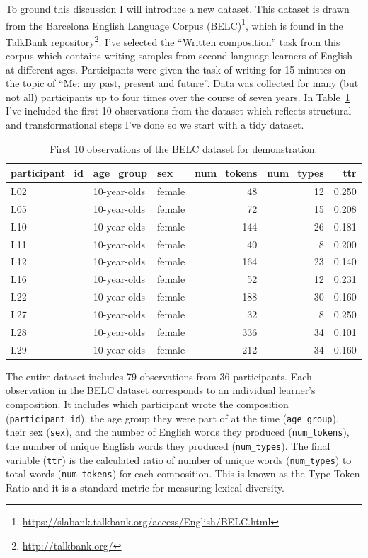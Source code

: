 \documentclass[
  letterpaper,
]{latex/krantz}
\DeclareRobustCommand{\href}[2]{#2\footnote{\url{#1}}}
\begin{document}
To ground this discussion I will introduce a new dataset. This dataset
is drawn from the
\href{https://slabank.talkbank.org/access/English/BELC.html}{Barcelona
English Language Corpus (BELC)}, which is found in the
\href{http://talkbank.org/}{TalkBank repository}. I've selected the
``Written composition'' task from this corpus which contains writing
samples from second language learners of English at different ages.
Participants were given the task of writing for 15 minutes on the topic
of ``Me: my past, present and future''. Data was collected for many (but
not all) participants up to four times over the course of seven years.
In Table~\ref{tbl-belc-overview} I've included the first 10 observations
from the dataset which reflects structural and transformational steps
I've done so we start with a tidy dataset.

\hypertarget{tbl-belc-overview}{}
\begin{table}
\caption{\label{tbl-belc-overview}First 10 observations of the BELC dataset for demonstration. }\tabularnewline

\centering
\begin{tabular}{l|l|l|r|r|r}
\hline
participant\_id & age\_group & sex & num\_tokens & num\_types & ttr\\
\hline
L02 & 10-year-olds & female & 48 & 12 & 0.250\\
\hline
L05 & 10-year-olds & female & 72 & 15 & 0.208\\
\hline
L10 & 10-year-olds & female & 144 & 26 & 0.181\\
\hline
L11 & 10-year-olds & female & 40 & 8 & 0.200\\
\hline
L12 & 10-year-olds & female & 164 & 23 & 0.140\\
\hline
L16 & 10-year-olds & female & 52 & 12 & 0.231\\
\hline
L22 & 10-year-olds & female & 188 & 30 & 0.160\\
\hline
L27 & 10-year-olds & female & 32 & 8 & 0.250\\
\hline
L28 & 10-year-olds & female & 336 & 34 & 0.101\\
\hline
L29 & 10-year-olds & female & 212 & 34 & 0.160\\
\hline
\end{tabular}
\end{table}

The entire dataset includes 79 observations from 36 participants. Each
observation in the BELC dataset corresponds to an individual learner's
composition. It includes which participant wrote the composition
(\texttt{participant\_id}), the age group they were part of at the time
(\texttt{age\_group}), their sex (\texttt{sex}), and the number of
English words they produced (\texttt{num\_tokens}), the number of unique
English words they produced (\texttt{num\_types}). The final variable
(\texttt{ttr}) is the calculated ratio of number of unique words
(\texttt{num\_types}) to total words (\texttt{num\_tokens}) for each
composition. This is known as the Type-Token Ratio and it is a standard
metric for measuring lexical diversity.
\end{document}
